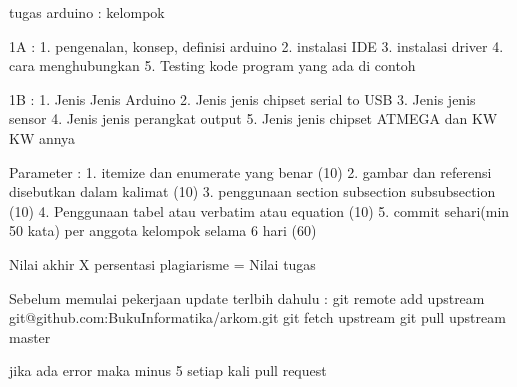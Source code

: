 tugas arduino :
kelompok

1A :
1. pengenalan, konsep, definisi arduino
2. instalasi IDE
3. instalasi driver
4. cara menghubungkan
5. Testing kode program yang ada di contoh

1B :
1. Jenis Jenis Arduino
2. Jenis jenis chipset serial to USB
3. Jenis jenis sensor
4. Jenis jenis perangkat output
5. Jenis jenis chipset ATMEGA dan KW KW annya



Parameter :
1. itemize dan enumerate yang benar (10)
2. gambar dan referensi disebutkan dalam kalimat (10)
3. penggunaan section subsection subsubsection (10)
4. Penggunaan tabel atau verbatim atau equation (10)
5. commit sehari(min 50 kata) per anggota kelompok selama 6 hari (60)

Nilai akhir X persentasi plagiarisme = Nilai tugas

Sebelum memulai pekerjaan update terlbih dahulu :
git remote add upstream git@github.com:BukuInformatika/arkom.git
git fetch upstream
git pull upstream master

jika ada error maka minus 5 setiap kali pull request